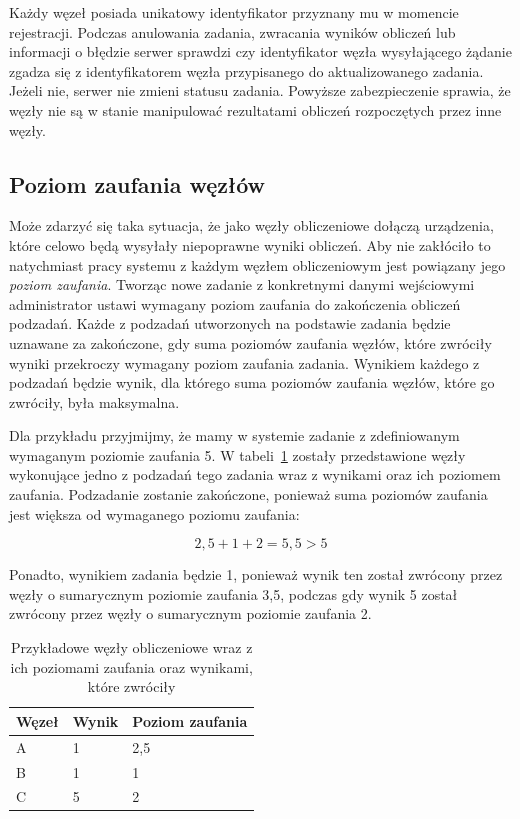 \documentclass[a4paper,11pt,twoside]{report}
\theoremstyle{definition}
\begin{document}
Każdy węzeł posiada unikatowy identyfikator przyznany mu w momencie rejestracji.
Podczas anulowania zadania, zwracania wyników obliczeń lub informacji o błędzie serwer sprawdzi czy identyfikator węzła wysyłającego żądanie zgadza się z identyfikatorem węzła przypisanego do aktualizowanego zadania.
Jeżeli nie, serwer nie zmieni statusu zadania.
Powyższe zabezpieczenie sprawia, że węzły nie są w stanie manipulować rezultatami obliczeń rozpoczętych przez inne węzły.

\subsection{Poziom zaufania węzłów}
\label{poziom-zaufania-wezlow}

Może zdarzyć się taka sytuacja, że jako węzły obliczeniowe dołączą urządzenia, które celowo będą wysyłały niepoprawne wyniki obliczeń. 
Aby nie zakłóciło to natychmiast pracy systemu z każdym węzłem obliczeniowym jest powiązany jego \textit{poziom zaufania}. Tworząc nowe zadanie z konkretnymi danymi wejściowymi administrator ustawi wymagany poziom zaufania do zakończenia obliczeń podzadań.
Każde z podzadań utworzonych na podstawie zadania będzie uznawane za zakończone, gdy suma poziomów zaufania węzłów, które zwróciły wyniki przekroczy wymagany poziom zaufania zadania.
Wynikiem każdego z podzadań będzie wynik, dla którego suma poziomów zaufania węzłów, które go zwróciły, była maksymalna.

Dla przykładu przyjmijmy, że mamy w systemie zadanie z zdefiniowanym wymaganym poziomie zaufania 5. W tabeli~\ref{trust-level-example} zostały przedstawione węzły wykonujące jedno z podzadań tego zadania wraz z wynikami oraz ich poziomem zaufania.
Podzadanie zostanie zakończone, ponieważ suma poziomów zaufania jest większa od wymaganego poziomu zaufania:

\[2,5 + 1 + 2 = 5,5 > 5\]

Ponadto, wynikiem zadania będzie 1, ponieważ wynik ten został zwrócony przez węzły o sumarycznym poziomie zaufania 3,5, podczas gdy wynik 5 został zwrócony przez węzły o sumarycznym poziomie zaufania 2.

\begin{table}
    \centering
    \caption{Przykładowe węzły obliczeniowe wraz z ich poziomami zaufania oraz wynikami, które zwróciły}
    \label{trust-level-example}
    \begin{tabular}{|l|l|l|}
        \hline
        Węzeł & Wynik & Poziom zaufania \\ \hline
        A     & 1     & 2,5             \\ \hline
        B     & 1     & 1               \\ \hline
        C     & 5     & 2               \\ \hline
    \end{tabular}
\end{table}
\end{document}
